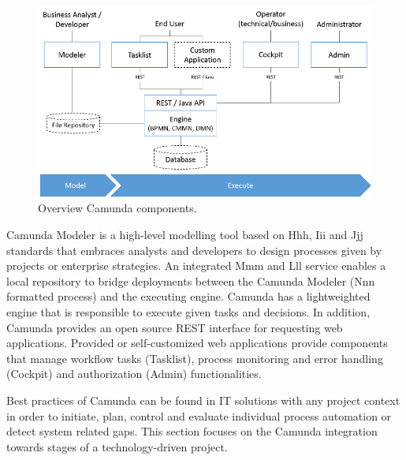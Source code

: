 \begin{figure}[!hb]
	\centering
	\includegraphics[scale=0.65]{CamundaArchitecture}
	\caption{Overview Camunda components. \cite{CamundaServicesGmbH.2019}}
\end{figure}

Camunda Modeler is a high-level modelling tool based on \gls{Hhh}, \gls{Iii} and \gls{Jjj} standards that embraces analysts and developers to design processes given by projects or enterprise strategies. An integrated \gls{Mmm} and \gls{Lll} service enables a local repository to bridge deployments between the Camunda Modeler (\gls{Nnn} formatted process) and the executing engine. Camunda has a lightweighted engine that is responsible to execute given tasks and decisions. In addition, Camunda provides an open source REST interface for requesting web applications. Provided or self-customized web applications provide components that manage workflow tasks (Tasklist), process monitoring and error handling (Cockpit) and authorization (Admin) functionalities. \cite{CamundaServicesGmbH.2019} 

\newpage
Best practices of Camunda can be found in IT solutions with any project context in order to initiate, plan, control and evaluate individual process automation or detect system related gaps.
This section focuses on the Camunda integration towards stages of a technology-driven project. \cite{RobertGimbel.20.2.2019} 

